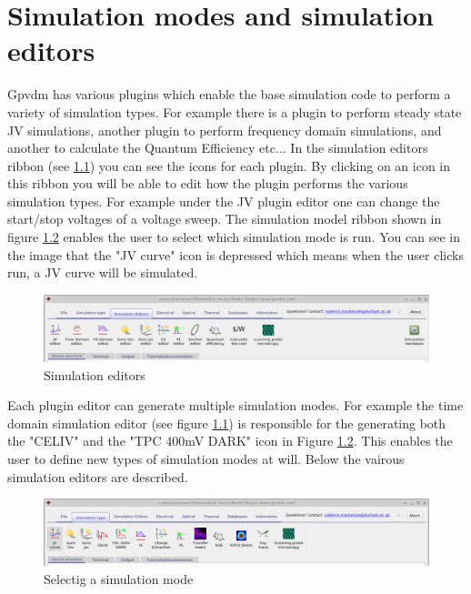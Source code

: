 \chapter{Simulation modes and simulation editors}
\label{sec:simmodes}

Gpvdm has various plugins which enable the base simulation code to perform a variety of simulation types. For example there is a plugin to perform steady state JV simulations, another plugin to perform frequency domain simulations, and another to calculate the Quantum Efficiency etc... In the simulation editors ribbon (see \ref{fig:simeditors}) you can see the icons for each plugin. By clicking on an icon in this ribbon you will be able to edit how the plugin performs the various simulation types.  For example under the JV plugin editor one can change the start/stop voltages of a voltage sweep.  The simulation model ribbon shown in figure \ref{fig:simmodes} enables the user to select which simulation mode is run.  You can see in the image that the "JV curve" icon is depressed which means when the user clicks run, a JV curve will be simulated.

\begin{figure}[H]
\centering
\includegraphics[width=1.0\textwidth]{./images/ribbon_sim_editors.png}
\caption{Simulation editors}
\label{fig:simeditors}
\end{figure}

Each plugin editor can generate multiple simulation modes.  For example the time domain simulation editor (see figure \ref{fig:simeditors}) is responsible for the generating both the "CELIV" and the "TPC 400mV DARK" icon in Figure \ref{fig:simmodes}. This enables the user to define new types of simulation modes at will. Below the vairous simulation editors are described.

\begin{figure}[H]
\centering
\includegraphics[width=1.0\textwidth]{./images/ribbon_sim_modes.png}
\caption{Selectig a simulation mode}
\label{fig:simmodes}
\end{figure}

